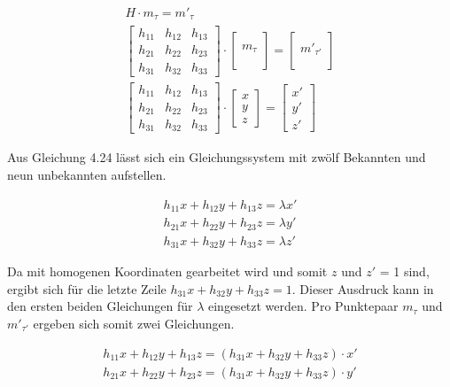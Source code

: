 \begin{gather}
	H\cdot m_\tau = m'_{\tau}\\
	\begin{bmatrix}
		h_{11}&h_{12}&h_{13}\\
		h_{21}&h_{22}&h_{23}\\
		h_{31}&h_{32}&h_{33}
	\end{bmatrix}
	\cdot
	\begin{bmatrix}
		\\m_\tau\\\\
	\end{bmatrix}
	=
	\begin{bmatrix}
		\\m'_{\tau'}\\\\
	\end{bmatrix}\\
	\begin{bmatrix}
		h_{11}&h_{12}&h_{13}\\
		h_{21}&h_{22}&h_{23}\\
		h_{31}&h_{32}&h_{33}
	\end{bmatrix}
	\cdot
	\begin{bmatrix}
		x\\y\\z
	\end{bmatrix}
	=
	\begin{bmatrix}
		x'\\y'\\z'
	\end{bmatrix}
\end{gather}

Aus Gleichung 4.24 lässt sich ein Gleichungssystem mit zwölf Bekannten und neun unbekannten aufstellen.  

\begin{gather}
	h_{11}x+h_{12}y+h_{13}z= \lambda x'\\
	h_{21}x+h_{22}y+h_{23}z= \lambda y'\\
	h_{31}x+h_{32}y+h_{33}z= \lambda z'
\end{gather}

Da mit homogenen Koordinaten gearbeitet wird und somit $z$ und $z'$ = 1 sind, ergibt sich für die letzte Zeile $h_{31}x+h_{32}y+h_{33}z= 1$. Dieser Ausdruck kann in den ersten beiden Gleichungen für $\lambda$ eingesetzt werden. Pro Punktepaar $m_\tau$ und $m'_{\tau'}$ ergeben sich somit zwei Gleichungen. 

\begin{gather}
	h_{11}x+h_{12}y+h_{13}z= (h_{31}x+h_{32}y+h_{33}z) \cdot x'\\
	h_{21}x+h_{22}y+h_{23}z= (h_{31}x+h_{32}y+h_{33}z) \cdot y'
\end{gather}

